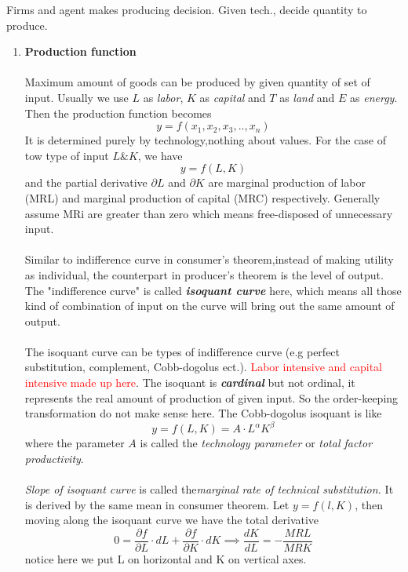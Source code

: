 \documentclass[10pt]{article}
\newenvironment{changemargin}[2]{%
  \begin{list}{}{%
    \setlength{\topsep}{0pt}%
    \setlength{\leftmargin}{#1}%
    \setlength{\rightmargin}{#2}%
    \setlength{\listparindent}{\parindent}%
    \setlength{\itemindent}{\parindent}%
    \setlength{\parsep}{\parskip}%
  }%
  \item[]}{\end{list}}
\begin{document}
\begin{changemargin}{-0.125in}{0in}
\begin{enumerate}
    \medskip
    
    Firms and agent makes producing decision. Given tech., decide quantity to produce.
    \\
    
    \begin{enumerate}
        \item \textbf{Production function}
        \\
        \\
        Maximum amount of goods can be produced by given quantity of set of input. Usually we use $L$ as \textit{labor}, $K$ as 
        \textit{capital} and $T$ as \textit{land} and $E$ as \textit{energy}. Then the production function becomes
        \[
        y= f(x_1,x_2,x_3,..,x_n) 
        \]
        It is determined purely by technology,nothing about values. For the case of tow type of input $L \& K$, we have 
        \[
        y = f(L,K)
        \]
        and the partial derivative $\partial L$ and $\partial K$ are marginal production of labor (MRL) and marginal production of capital (MRC) respectively. Generally assume MRi are greater than zero which means free-disposed of unnecessary input. 
        \\
        \\
        Similar to indifference curve in consumer's theorem,instead of making utility as individual, the counterpart in producer's theorem is the level of output. The "indifference curve" is called \textbf{\textit{isoquant curve}} here, which means all those kind of combination of input on the curve will bring out the same amount of output. 
        \\
        \\
        The isoquant curve can be types of indifference curve (e.g perfect substitution, complement, Cobb-dogolus ect.). \textcolor{red}{Labor intensive and capital intensive made up here}. The isoquant is \textbf{\textit{cardinal}} but not ordinal, it represents the real amount of production of given input. So the order-keeping transformation do not make sense here. The Cobb-dogolus isoquant is like
        \[
        y=f(L,K) = A\cdot L^\alpha K^\beta
        \]
        where the parameter $A$ is called the \textit{technology parameter} or \textit{total factor productivity}.
        \\
        \\
        \textit{Slope of isoquant curve} is called the\textit{marginal rate of technical substitution.} It is derived by the same mean in consumer theorem. Let $y=f(l,K)$, then moving along the isoquant curve we have the total derivative 
        \[
        0 = \frac{\partial f}{\partial L} \cdot dL + \frac{\partial f}{\partial K} \cdot dK \implies \frac{dK}{dL}= - \frac{MRL}{MRK}
        \]
        notice here we put L on horizontal and K on vertical axes. 
        

\end{enumerate}
\end{enumerate}
\end{changemargin}
\end{document}
